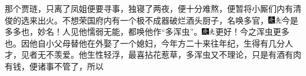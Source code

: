{那个贾琏，只离了凤姐便要寻事，独寝了两夜，便十分难熬，便暂将小厮们内有清俊的选来出火。不想荣国府内有一个极不成器破烂酒头厨子，名唤多官，{\includegraphics[width=3mm]{../Images/00004}\includegraphics[width=3mm]{../Images/00012}\footnotesize \kaishu 今是多多也，妙名！}人见他懦弱无能，都唤他作“多浑虫”。{\includegraphics[width=3mm]{../Images/00004}\includegraphics[width=3mm]{../Images/00012}\footnotesize \kaishu 更好！今之浑虫更多也。}因他自小父母替他在外娶了一个媳妇，今年方二十来往年纪，生得有几分人才，见者无不羡爱。他生性轻浮，最喜拈花惹草，多浑虫又不理论，只是有酒有肉有钱，便诸事不管了，所以}
